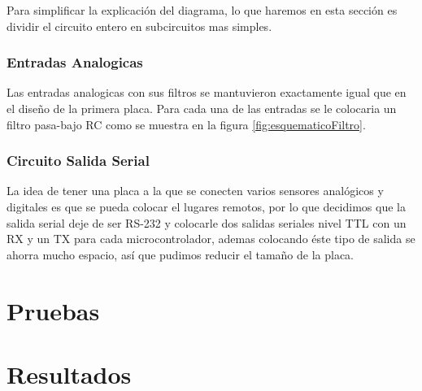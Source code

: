 Para simplificar la explicación del diagrama, lo que haremos en esta sección es dividir el circuito entero en subcircuitos mas simples.

\subsubsection{Entradas Analogicas}
\label{entradas_analogicas2}

Las entradas analogicas con sus filtros se mantuvieron exactamente igual que en el diseño de la primera placa. Para cada una de las entradas se le colocaria un filtro pasa-bajo RC como se muestra en la figura \ref{fig:esquematicoFiltro}.


\subsubsection{Circuito Salida Serial}
\label{salida_serial2}

La idea de tener una placa a la que se conecten varios sensores analógicos y digitales es que se pueda colocar el lugares remotos, por lo que decidimos que la salida serial deje de ser RS-232 y colocarle dos salidas seriales nivel TTL con un RX y un TX para cada microcontrolador, ademas colocando éste tipo de salida se ahorra mucho espacio, así que pudimos reducir el tamaño de la placa. 




\section{Pruebas} %
\label{sec:pruebas}


\section{Resultados} %
\label{sec:resultados}


